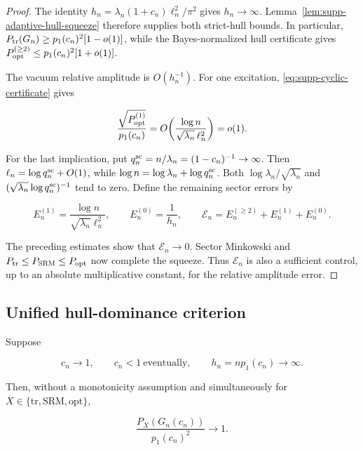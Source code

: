 \begin{proof}
The identity
\(h_n=\lambda_n(1+c_n)\ell_n^2/\pi^2\) gives \(h_n\to\infty\).
Lemma~\ref{lem:supp-adaptive-hull-squeeze} therefore
supplies both strict-hull bounds.  In particular,
\(P_{\rm tr}(G_n)\ge p_1(c_n)^2[1-o(1)]\), while the Bayes-normalized hull
certificate gives
\(P_{\rm opt}^{(\ge2)}\le p_1(c_n)^2[1+o(1)]\).

The vacuum relative amplitude is \(O(h_n^{-1})\).  For one excitation,
\eqref{eq:supp-cyclic-certificate} gives

\[
 \frac{\sqrt{P_{\rm opt}^{(1)}}}{p_1(c_n)}
 =O\!\left(
 \frac{\log n}{\sqrt{\lambda_n}\,\ell_n^2}
 \right)=o(1).
\]

For the last implication, put
\(q_n^{\rm sc}=n/\lambda_n=(1-c_n)^{-1}\to\infty\).
Then \(\ell_n=\log q_n^{\rm sc}+O(1)\), while
\(\log n=\log\lambda_n+\log q_n^{\rm sc}\).  Both
\(\log\lambda_n/\sqrt{\lambda_n}\) and
\((\sqrt{\lambda_n}\log q_n^{\rm sc})^{-1}\) tend to zero.
Define the remaining sector errors by

\[
 E_n^{(1)}=\frac{\log n}{\sqrt{\lambda_n}\ell_n^2},
 \qquad E_n^{(0)}=\frac1{h_n},
 \qquad \mathcal E_n=E_n^{(\ge2)}+E_n^{(1)}+E_n^{(0)}.
\]

The preceding estimates show that \(\mathcal E_n\to0\).  Sector Minkowski and
\(P_{\rm tr}\le P_{\rm SRM}\le P_{\rm opt}\) now complete the squeeze.  Thus
\(\mathcal E_n\) is also a sufficient control, up to an absolute multiplicative
constant, for the relative amplitude error.
\end{proof}

\subsection{Unified hull-dominance criterion}

\begin{theorem}
\label{thm:supp-hull-dominance}
Suppose

\[
 c_n\to1,\qquad c_n<1\ \text{eventually},\qquad
 h_n=np_1(c_n)\to\infty.
\]

Then, without a monotonicity assumption and simultaneously for
\(X\in\{\mathrm{tr},\mathrm{SRM},\mathrm{opt}\}\),

\[
 \frac{P_X(G_n(c_n))}{p_1(c_n)^2}\longrightarrow1.
\]
\end{theorem}

